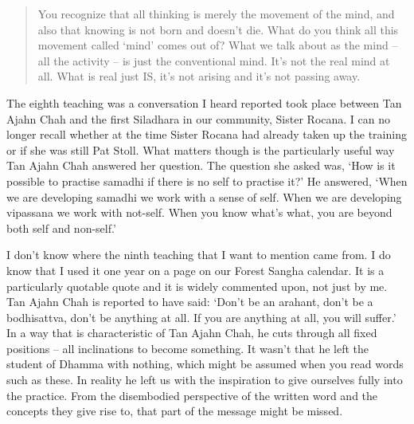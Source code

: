 \begin{quotation}
You recognize that all thinking is merely the movement of the mind, and
also that knowing is not born and doesn't die. What do you think all
this movement called `mind' comes out of? What we talk about as the mind
-- all the activity -- is just the conventional mind. It's not the real
mind at all. What is real just IS, it's not arising and it's not passing
away.
\end{quotation}

The eighth teaching was a conversation I heard reported took place between Tan
Ajahn Chah and the first Siladhara in our community, Sister Rocana.
I can no longer recall
whether at the time Sister Rocana had already taken up the training
or if she was still Pat Stoll. What matters though is the particularly
useful way Tan Ajahn Chah answered her question. The question she asked
was, `How is it possible to practise samadhi if there is no self to practise it?' He
answered, `When we are developing samadhi we work with a sense of self.
When we are developing vipassana we work with not-self.
When you know what's what, you are beyond both self and non-self.'

I don't know where the ninth teaching that I want to mention came from.
I do know that I used it one year on a page on our Forest Sangha
calendar. It is a particularly quotable quote\cite{centre}
and it is widely commented upon, not just by me. Tan
Ajahn Chah is reported to have said: `Don't be an arahant, don't be a
bodhisattva, don't be anything at all. If you are anything at all, you
will suffer.' In a way that is characteristic of Tan Ajahn Chah, he cuts
through all fixed positions -- all inclinations to become something. It
wasn't that he left the student of Dhamma with nothing, which might be
assumed when you read words such as these. In reality he left us with
the inspiration to give ourselves fully into the practice. From the
disembodied perspective of the written word and the concepts they give
rise to, that part of the message might be missed.

